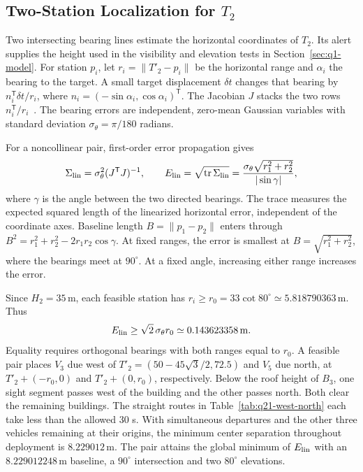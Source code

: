 \documentclass{swmcmthesis}
\begin{document}
\subsection{Two-Station Localization for \texorpdfstring{\(T_2\)}{T2}}
\label{sec:q21-model}

Two intersecting bearing lines estimate the horizontal coordinates of \(T_2\). Its alert supplies the height used in the visibility and elevation tests in Section~\ref{sec:q1-model}. For station \(p_i\), let \(r_i=\|T'_2-p_i\|\) be the horizontal range and \(\alpha_i\) the bearing to the target. A small target displacement \(\delta t\) changes that bearing by \(n_i^{\mathsf T}\delta t/r_i\), where \(n_i=(-\sin\alpha_i,\cos\alpha_i)^{\mathsf T}\). The Jacobian \(J\) stacks the two rows \(n_i^{\mathsf T}/r_i\)~\cite{ref:bearing-geometry}. The bearing errors are independent, zero-mean Gaussian variables with standard deviation \(\sigma_\theta=\pi/180\) radians.

For a noncollinear pair, first-order error propagation gives
\begin{equation}
\label{eq:q21-linearized-error}
\Sigma_{\rm lin}=\sigma_\theta^2(J^{\mathsf T}J)^{-1},\qquad
E_{\rm lin}=\sqrt{\operatorname{tr}\Sigma_{\rm lin}}
    =\frac{\sigma_\theta\sqrt{r_1^2+r_2^2}}{|\sin\gamma|},
\end{equation}
where \(\gamma\) is the angle between the two directed bearings. The trace measures the expected squared length of the linearized horizontal error, independent of the coordinate axes. Baseline length \(B=\|p_1-p_2\|\) enters through \(B^2=r_1^2+r_2^2-2r_1r_2\cos\gamma\). At fixed ranges, the error is smallest at \(B=\sqrt{r_1^2+r_2^2}\), where the bearings meet at \(90^\circ\). At a fixed angle, increasing either range increases the error.

Since \(H_2=35\,\mathrm m\), each feasible station has \(r_i\ge r_0=33\cot80^\circ\simeq5.818790363\,\mathrm m\). Thus
\begin{equation}
\label{eq:q21-error-lower-bound}
E_{\rm lin}\ge\sqrt{2}\,\sigma_\theta r_0\simeq0.143623358\,\mathrm m.
\end{equation}
Equality requires orthogonal bearings with both ranges equal to \(r_0\). A feasible pair places \(V_3\) due west of \(T'_2=(50-45\sqrt{3}/2,72.5)\) and \(V_5\) due north, at \(T'_2+(-r_0,0)\) and \(T'_2+(0,r_0)\), respectively. Below the roof height of \(B_3\), one sight segment passes west of the building and the other passes north. Both clear the remaining buildings. The straight routes in Table~\ref{tab:q21-west-north} each take less than the allowed 30 s. With simultaneous departures and the other three vehicles remaining at their origins, the minimum center separation throughout deployment is \(8.229012\,\mathrm m\). The pair attains the global minimum of \(E_{\rm lin}\) with an \(8.229012248\,\mathrm m\) baseline, a \(90^\circ\) intersection and two \(80^\circ\) elevations.
\end{document}
